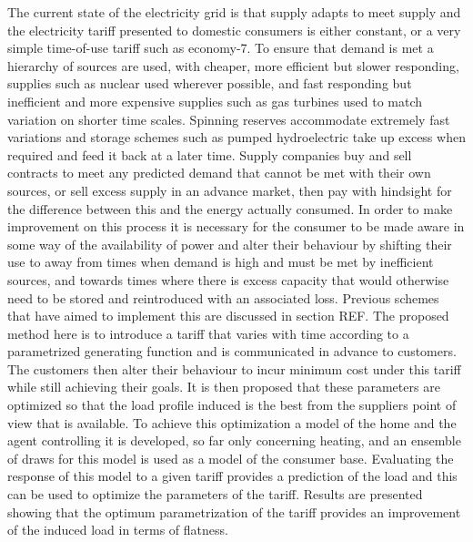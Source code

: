 \documentclass[a4paper, 10 pt, conference]{ieeeconf}  %
\begin{document}
The current state of the electricity grid is that supply adapts to meet supply and the electricity tariff presented to domestic consumers is either constant, or a very simple time-of-use tariff such as economy-7. To ensure that demand is met a hierarchy of sources are used, with cheaper, more efficient but slower responding, supplies such as nuclear used wherever possible, and fast responding but inefficient and more expensive supplies such as gas turbines used to match variation on shorter time scales. Spinning reserves accommodate extremely fast variations and storage schemes such as pumped hydroelectric take up excess when required and feed it back at a later time.
Supply companies buy and sell contracts to meet any predicted demand that cannot be met with their own sources, or sell excess supply in an advance market, then pay with hindsight for the difference between this and the energy actually consumed.
In order to make improvement on this process it is necessary for the consumer to be made aware in some way of the availability of power and alter their behaviour by shifting their use to away from times when demand is high and must be met by inefficient sources, and towards times where there is excess capacity that would otherwise need to be stored and reintroduced with an associated loss. Previous schemes that have aimed to implement this are discussed in section REF. The proposed method here is to introduce a tariff that varies with time according to a parametrized generating function and is communicated in advance to customers. The customers then alter their behaviour to incur minimum cost under this tariff while still achieving their goals. It is then proposed that these parameters are optimized so that the load profile induced is the best from the suppliers point of view that is available.
To achieve this optimization a model of the home and the agent controlling it is developed, so far only concerning heating, and an ensemble of draws for this model is used as a model of the consumer base. Evaluating the response of this model to a given tariff provides a prediction of the load and this can be used to optimize the parameters of the tariff. Results are presented showing that the optimum parametrization of the tariff provides an improvement of the induced load in terms of flatness.


\end{document}

